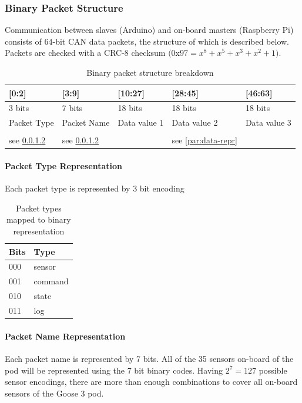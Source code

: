     \subsubsection{Binary Packet Structure}
    Communication between slaves (Arduino) and on-board masters (Raspberry Pi) consists of 64-bit CAN data packets, the structure of which is described below. Packets are checked with a CRC-8 checksum $(0$x$97 = x^8 + x^5 + x^3 + x^2 + 1)$.
    \begin{table}[H]
        \centering
        \begin{tabulary}{\textwidth}{@{}LLlll@{}} \toprule
            {[0:2]} & {[3:9]} & {[10:27]} & {[28:45]} & {[46:63]}\\  bits & 7 bits & 18 bits & 18 bits & 18 bits\\
            Packet Type & Packet Name & Data value 1 & Data value 2 & Data value 3\\ 
            \\
            see \ref{par:packet-name-repr} & see \ref{par:packet-name-repr} & & see \ref{par:data-repr} \\ \bottomrule
        \end{tabulary}
        \caption{Binary packet structure breakdown}
    \end{table}
    \paragraph{Packet Type Representation}
    \label{par:packet-type-repr}
    Each packet type is represented by 3 bit encoding
    \begin{table}[H]
        \centering
        \begin{tabular}{@{}ll@{}} \toprule
            Bits & Type\\ \midrule
            000 & sensor\\
            001 & command\\
            010 & state\\
            011 & log\\ \bottomrule
        \end{tabular}
        \caption{Packet types mapped to binary representation}
    \end{table}

    \paragraph{Packet Name Representation}
    \label{par:packet-name-repr}
    Each packet name is represented by 7 bits. All of the 35 sensors on-board of the pod will be represented using the 7 bit binary codes. Having $2^7=127$ possible sensor encodings, there are more than enough combinations to cover all on-board sensors of the Goose 3 pod.

